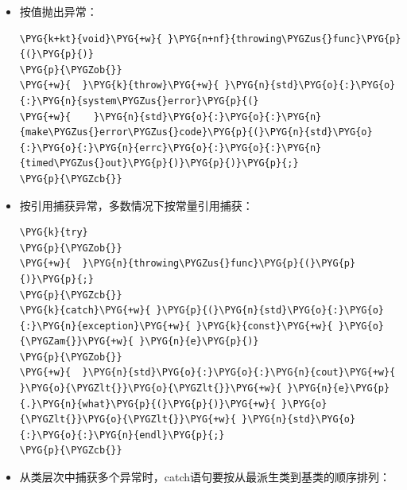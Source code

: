 \begin{itemize}
\item 按值抛出异常：



\begin{codeblockbg}
\begin{Verbatim}[commandchars=\\\{\},breaklines=true,breakanywhere=true,fontsize=\codefont,xleftmargin=17bp]
\PYG{k+kt}{void}\PYG{+w}{ }\PYG{n+nf}{throwing\PYGZus{}func}\PYG{p}{(}\PYG{p}{)}
\PYG{p}{\PYGZob{}}
\PYG{+w}{  }\PYG{k}{throw}\PYG{+w}{ }\PYG{n}{std}\PYG{o}{:}\PYG{o}{:}\PYG{n}{system\PYGZus{}error}\PYG{p}{(}
\PYG{+w}{    }\PYG{n}{std}\PYG{o}{:}\PYG{o}{:}\PYG{n}{make\PYGZus{}error\PYGZus{}code}\PYG{p}{(}\PYG{n}{std}\PYG{o}{:}\PYG{o}{:}\PYG{n}{errc}\PYG{o}{:}\PYG{o}{:}\PYG{n}{timed\PYGZus{}out}\PYG{p}{)}\PYG{p}{)}\PYG{p}{;}
\PYG{p}{\PYGZcb{}}
\end{Verbatim}
\end{codeblockbg}



\item 按引用捕获异常，多数情况下按常量引用捕获：



\begin{codeblockbg}
\begin{Verbatim}[commandchars=\\\{\},breaklines=true,breakanywhere=true,fontsize=\codefont,xleftmargin=17bp]
\PYG{k}{try}
\PYG{p}{\PYGZob{}}
\PYG{+w}{  }\PYG{n}{throwing\PYGZus{}func}\PYG{p}{(}\PYG{p}{)}\PYG{p}{;}
\PYG{p}{\PYGZcb{}}
\PYG{k}{catch}\PYG{+w}{ }\PYG{p}{(}\PYG{n}{std}\PYG{o}{:}\PYG{o}{:}\PYG{n}{exception}\PYG{+w}{ }\PYG{k}{const}\PYG{+w}{ }\PYG{o}{\PYGZam{}}\PYG{+w}{ }\PYG{n}{e}\PYG{p}{)}
\PYG{p}{\PYGZob{}}
\PYG{+w}{  }\PYG{n}{std}\PYG{o}{:}\PYG{o}{:}\PYG{n}{cout}\PYG{+w}{ }\PYG{o}{\PYGZlt{}}\PYG{o}{\PYGZlt{}}\PYG{+w}{ }\PYG{n}{e}\PYG{p}{.}\PYG{n}{what}\PYG{p}{(}\PYG{p}{)}\PYG{+w}{ }\PYG{o}{\PYGZlt{}}\PYG{o}{\PYGZlt{}}\PYG{+w}{ }\PYG{n}{std}\PYG{o}{:}\PYG{o}{:}\PYG{n}{endl}\PYG{p}{;}
\PYG{p}{\PYGZcb{}}
\end{Verbatim}
\end{codeblockbg}



\item 从类层次中捕获多个异常时，catch语句要按从最派生类到基类的顺序排列：




\end{itemize}
